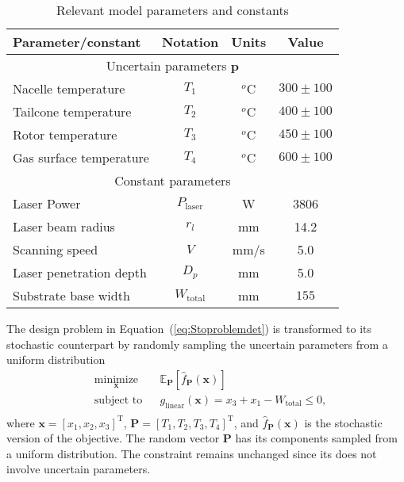 \begin{table}[h!]
	\centering
	\renewcommand{\arraystretch}{1.0}%
	\small\addtolength{\tabcolsep}{-2pt}
	\caption{Relevant model parameters and constants}
	\label{table:STOmodelparameters}
	\begin{tabular}{lccc}
	\hline\hline
	\bf Parameter/constant & \bf Notation & \bf Units & \bf Value \\
	\hline
    \multicolumn{4}{c}{Uncertain parameters $\mathbf{p}$} \\ 
	Nacelle temperature & $T_1$ & $^{o}$C & $300 \pm 100$ \\ 
	Tailcone temperature & $T_2$ & $^{o}$C & $400 \pm 100$ \\ 
	Rotor temperature & $T_3$ & $^{o}$C & $450 \pm 100$ \\ 
	Gas surface temperature & $T_4$ & $^{o}$C & $600 \pm 100$ \\ \hline
    \multicolumn{4}{c}{Constant parameters} \\
	Laser Power & ${P_\textrm{laser}}$ & W &  3806 \\ 
	Laser beam radius & ${r_l}$ & mm & 14.2 \\ 
	Scanning speed& ${V}$ & mm/s & 5.0 \\ 
	Laser penetration depth & $D_p$ & mm & 5.0 \\
	Substrate base width & $W_{\textrm{total}}$ & mm & $155$ \\
	\hline\hline
	\end{tabular}
\end{table}

The design problem in Equation~(\ref{eq:Stoproblemdet}) is transformed to its stochastic counterpart by randomly sampling the uncertain parameters from a uniform distribution
%
\begin{equation}
	\begin{aligned}
		& \underset{\mathbf{x}}{\text{minimize}}
		& & \mathbb{E}_{\mathbf{P}}\left[\hat{f}_{\mathbf{P}}(\mathbf{x})\right]\\
		& \text{subject to}
		& & {g_{\textrm{linear}}}(\mathbf{x}) = x_3 + x_1 - W_{\textrm{total}} \le 0,\\
	\end{aligned}
	\label{eq:STOproblemsto}
\end{equation}
%
where $\mathbf{x} = \left[x_1,x_2,x_3\right]^{\textrm{T}}$, $\mathbf{P} = \left[T_1,T_2,T_3,T_4\right]^{\textrm{T}}$, and $\hat{f}_{\mathbf{P}}(\mathbf{x})$ is the stochastic version of the objective. The random vector $\mathbf{P}$ has its components sampled from a uniform distribution. The constraint remains unchanged since its does not involve uncertain parameters.

